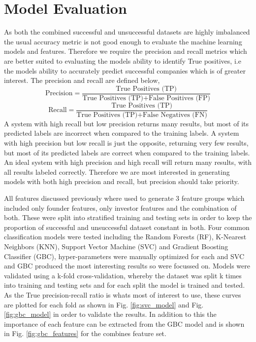 \documentclass{article}
\begin{document}

\section{Model Evaluation}
\label{sec:model_evaluation}

As both the combined successful and unsuccessful datasets are highly imbalanced the usual accuracy metric is not good enough to evaluate the machine learning models and features. Therefore we require the precision and recall metrics which are better suited to evaluating the models ability to identify True positives, i.e the models ability to accurately predict successful companies which is of greater interest. The precision and recall are defined below,
\begin{equation}
	\textrm{Precision}=\frac{\textrm{True Positives (TP)}}{\textrm{True Positives (TP)}+\textrm{False Positives (FP)}}
\end{equation}
\begin{equation}
	\textrm{Recall}=\frac{\textrm{True Positives (TP)}}{\textrm{True Positives (TP)}+\textrm{False Negatives (FN)}}
\end{equation}
A system with high recall but low precision returns many results, but most of its predicted labels are incorrect when compared to the training labels. A system with high precision but low recall is just the opposite, returning very few results, but most of its predicted labels are correct when compared to the training labels. An ideal system with high precision and high recall will return many results, with all results labeled correctly. Therefore we are most interested in generating models with both high precision and recall, but precision should take priority.

All features discussed previously where used to generate 3 feature groups which included only founder features, only investor features and the combination of both. These were split into stratified training and testing sets in order to keep the proportion of successful and unsuccessful dataset constant in both. Four common classification models were tested including the Random Forests (RF), K-Nearest Neighbors (KNN), Support Vector Machine (SVC) and Gradient Boosting Classifier (GBC), hyper-parameters were manually optimized for each and SVC and GBC produced the most interesting results so were focussed on. Models were validated using a k-fold cross-validation, whereby the dataset was split k times into training and testing sets and for each split the model is trained and tested. As the True precision-recall ratio is whats most of interest to use, these curves are plotted for each fold as shown in Fig. \ref{fig:svc_model} and Fig. \ref{fig:gbc_model} in order to validate the results. In addition to this the importance of each feature can be extracted from the GBC model and is shown in Fig. \ref{fig:gbc_features} for the combines feature set.
\end{document}
